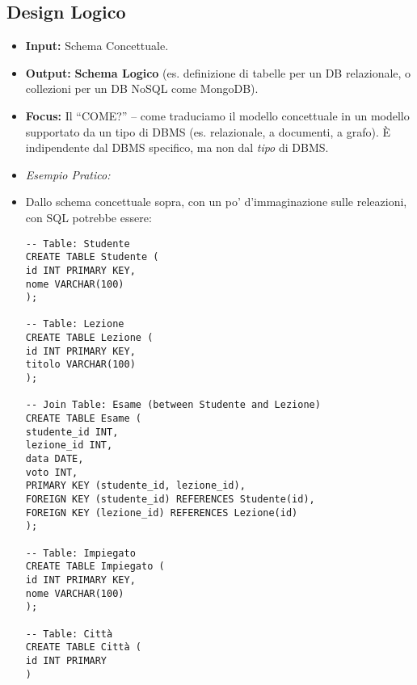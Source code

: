 \subsection{Design Logico}
\begin{itemize}
	\item \textbf{Input:} Schema Concettuale.
	\item \textbf{Output:} \textbf{Schema Logico} (es. definizione di tabelle per un DB relazionale, o collezioni per un DB NoSQL come MongoDB).
	\item \textbf{Focus:} Il ``COME?'' – come traduciamo il modello concettuale in un modello supportato da un tipo di DBMS (es. relazionale, a documenti, a grafo). È indipendente dal DBMS specifico, ma non dal \textit{tipo} di DBMS.
	\item \textit{Esempio Pratico:}\\
	\begin{center}
	\end{center}
	
	
	\item Dallo schema concettuale sopra, con un po' d'immaginazione sulle releazioni, con SQL potrebbe essere:
	\begin{verbatim}
-- Table: Studente
CREATE TABLE Studente (
id INT PRIMARY KEY,
nome VARCHAR(100)
);

-- Table: Lezione
CREATE TABLE Lezione (
id INT PRIMARY KEY,
titolo VARCHAR(100)
);

-- Join Table: Esame (between Studente and Lezione)
CREATE TABLE Esame (
studente_id INT,
lezione_id INT,
data DATE,
voto INT,
PRIMARY KEY (studente_id, lezione_id),
FOREIGN KEY (studente_id) REFERENCES Studente(id),
FOREIGN KEY (lezione_id) REFERENCES Lezione(id)
);

-- Table: Impiegato
CREATE TABLE Impiegato (
id INT PRIMARY KEY,
nome VARCHAR(100)
);

-- Table: Città
CREATE TABLE Città (
id INT PRIMARY
)
	\end{verbatim}
\end{itemize}

